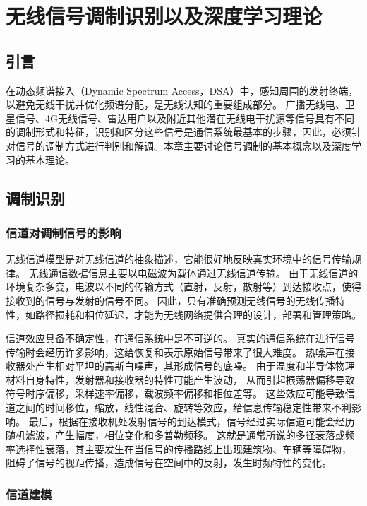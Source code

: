 
\chapter{无线信号调制识别以及深度学习理论}
\label{chap: mod_rec_deep_learning_theo}
\section{引言}
在动态频谱接入（Dynamic Spectrum Access，DSA）中，感知周围的发射终端，以避免无线干扰并优化频谱分配，是无线认知的重要组成部分。 广播无线电、卫星信号、4G无线信号、雷达用户以及附近其他潜在无线电干扰源等信号具有不同的调制形式和特征，识别和区分这些信号是通信系统最基本的步骤，因此，必须针对信号的调制方式进行判别和解调。本章主要讨论信号调制的基本概念以及深度学习的基本理论。

\section{调制识别}

\subsection{信道对调制信号的影响}
无线信道模型是对无线信道的抽象描述，它能很好地反映真实环境中的信号传输规律。
无线通信数据信息主要以电磁波为载体通过无线信道传输。 
由于无线信道的环境复杂多变，电波以不同的传输方式（直射，反射，散射等）到达接收点，使得接收到的信号与发射的信号不同。
因此，只有准确预测无线信号的无线传播特性，如路径损耗和相位延迟，才能为无线网络提供合理的设计，部署和管理策略。\par

信道效应具备不确定性，在通信系统中是不可逆的。
真实的通信系统在进行信号传输时会经历许多影响，这给恢复和表示原始信号带来了很大难度。
热噪声在接收器处产生相对平坦的高斯白噪声，其形成信号的底噪。
由于温度和半导体物理材料自身特性，发射器和接收器的特性可能产生波动，
从而引起振荡器偏移导致符号时序偏移，采样速率偏移，载波频率偏移和相位差等。
这些效应可能导致信道之间的时间移位，缩放，线性混合、旋转等效应，给信息传输稳定性带来不利影响。
最后，根据在接收机处发射信号的到达模式，信号经过实际信道可能会经历随机滤波，产生幅度，相位变化和多普勒频移。
这就是通常所说的多径衰落或频率选择性衰落，其主要发生在当信号的传播路线上出现建筑物、车辆等障碍物，
阻碍了信号的视距传播，造成信号在空间中的反射，发生时频特性的变化。\par

\subsection{信道建模}


